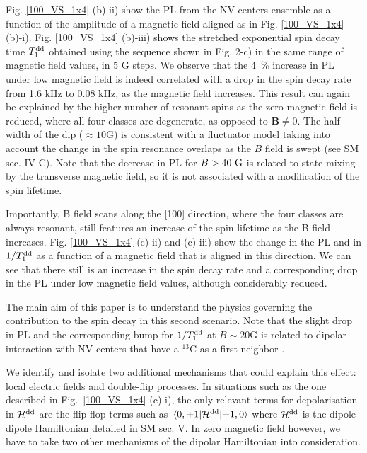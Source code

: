 \documentclass[preprintnumbers,amsmath,amssymb,superscriptaddress,twocolumn,showpacs]{revtex4-2}
\begin{document}
Fig. \ref{100_VS_1x4} (b)-ii) show the PL from the NV centers ensemble as a function of the amplitude of a magnetic field aligned as in Fig. \ref{100_VS_1x4} (b)-i). 
Fig. \ref{100_VS_1x4} (b)-iii) shows the stretched exponential spin decay time $T_1^{\rm dd}$ obtained using the sequence shown in Fig. 2-c) in the same range of magnetic field values, in 5 G steps. 
We observe that the 4~\% increase in PL under low magnetic field is indeed correlated with a drop in the spin decay rate from 1.6 kHz to 0.08 kHz, as the magnetic field increases. This result can again be explained by the higher number of resonant spins as the zero magnetic field is reduced, where all four classes are degenerate, as opposed to $\bm B \neq 0$. The half width of the dip ($\approx 10$G) is consistent with a fluctuator model taking into account the change in the spin resonance overlaps as the $B$ field is swept (see SM sec. IV C).
Note that the decrease in PL for $B>40\ \rm G$ is related to state mixing by the transverse magnetic field, so it is not associated with a modification of the spin lifetime. 

Importantly, B field scans along the [100] direction, where the four classes are always resonant, still features an increase of the spin lifetime as the B field increases. Fig. \ref{100_VS_1x4} (c)-ii) and (c)-iii) show the change in the PL and in $1/T_1^{\rm dd}$ as a function of a magnetic field that is aligned in this direction. We can see that there still is an increase in the spin decay rate and a corresponding drop in the PL under low magnetic field values, although considerably reduced. 

The main aim of this paper is to understand the physics governing the contribution to the spin decay in this second scenario. Note that the slight drop in PL and the corresponding bump for $1/T_1^{\rm dd}$ at $B \sim 20$G is related to dipolar interaction with NV centers that have a $^{13}$C as a first neighbor \cite{pellet2021optical}. 

We identify and isolate two additional mechanisms that could explain this effect: local electric fields and double-flip processes. 
 In situations such as the one described in Fig.~\ref{100_VS_1x4} (c)-i), the only relevant terms for depolarisation in $\mathcal{H}^{\rm dd}$ are the flip-flop terms such as $\mel{0,+1}{\mathcal{H}^{\rm dd}}{+1,0}$ where $\mathcal{H}^{\rm dd}$ is the dipole-dipole Hamiltonian detailed in SM sec. V. In zero magnetic field however, we have to take two other mechanisms of the dipolar Hamiltonian into consideration.
\end{document}

